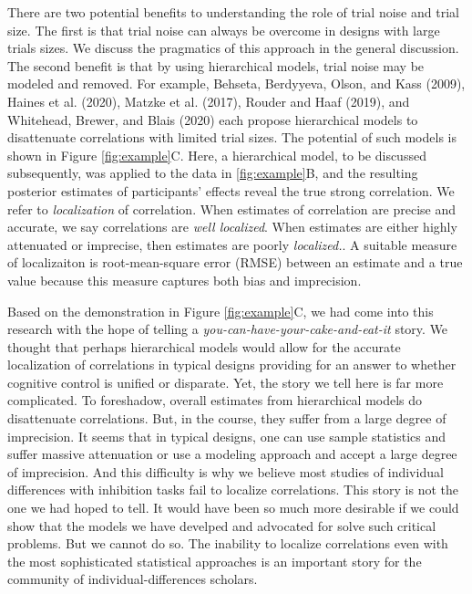 \documentclass[
  ,man]{apa6}
\begin{document}
There are two potential benefits to understanding the role of trial noise and trial size. The first is that trial noise can always be overcome in designs with large trials sizes. We discuss the pragmatics of this approach in the general discussion. The second benefit is that by using hierarchical models, trial noise may be modeled and removed. For example, Behseta, Berdyyeva, Olson, and Kass (2009), Haines et al. (2020), Matzke et al. (2017), Rouder and Haaf (2019), and Whitehead, Brewer, and Blais (2020) each propose hierarchical models to disattenuate correlations with limited trial sizes. The potential of such models is shown in Figure \ref{fig:example}C. Here, a hierarchical model, to be discussed subsequently, was applied to the data in \ref{fig:example}B, and the resulting posterior estimates of participants' effects reveal the true strong correlation. We refer to \emph{localization} of correlation. When estimates of correlation are precise and accurate, we say correlations are \emph{well localized}. When estimates are either highly attenuated or imprecise, then estimates are poorly \emph{localized.}. A suitable measure of localizaiton is root-mean-square error (RMSE) between an estimate and a true value because this measure captures both bias and imprecision.

Based on the demonstration in Figure \ref{fig:example}C, we had come into this research with the hope of telling a \emph{you-can-have-your-cake-and-eat-it} story. We thought that perhaps hierarchical models would allow for the accurate localization of correlations in typical designs providing for an answer to whether cognitive control is unified or disparate. Yet, the story we tell here is far more complicated. To foreshadow, overall estimates from hierarchical models do disattenuate correlations. But, in the course, they suffer from a large degree of imprecision. It seems that in typical designs, one can use sample statistics and suffer massive attenuation or use a modeling approach and accept a large degree of imprecision. And this difficulty is why we believe most studies of individual differences with inhibition tasks fail to localize correlations. This story is not the one we had hoped to tell. It would have been so much more desirable if we could show that the models we have develped and advocated for solve such critical problems. But we cannot do so. The inability to localize correlations even with the most sophisticated statistical approaches is an important story for the community of individual-differences scholars.
\end{document}

